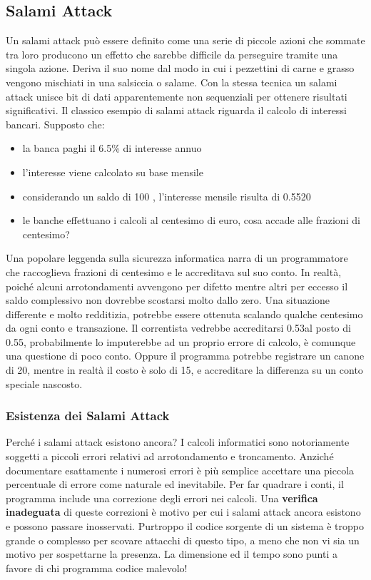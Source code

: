 \subsection{Salami Attack}
Un salami attack può essere definito come una serie di piccole azioni che sommate tra loro producono un effetto che sarebbe difficile da perseguire tramite una singola azione.
Deriva il suo nome dal modo in cui i pezzettini di carne e grasso vengono mischiati in una salsiccia o salame. Con la stessa tecnica un salami attack unisce bit di dati apparentemente non sequenziali per ottenere risultati significativi. Il classico esempio di salami attack riguarda il calcolo di interessi bancari. Supposto che:
\begin{itemize}
	\item la banca paghi il 6.5\% di interesse annuo
	\item l'interesse viene calcolato su base mensile
	\item considerando un saldo di 100 \officialeuro, l'interesse mensile risulta di 0.5520 \officialeuro
	\item le banche effettuano i calcoli al centesimo di euro, cosa accade alle frazioni di centesimo?
\end{itemize}
Una popolare leggenda sulla sicurezza informatica narra di un programmatore che raccoglieva frazioni di centesimo e le accreditava sul suo conto.
In realtà, poiché alcuni arrotondamenti avvengono per difetto mentre altri per eccesso il saldo complessivo non dovrebbe scostarsi molto dallo zero.
\newline
Una situazione differente e molto redditizia, potrebbe essere ottenuta scalando qualche centesimo da ogni conto e transazione. Il correntista vedrebbe accreditarsi 0.53\officialeuro al posto di 0.55\officialeuro, probabilmente lo imputerebbe ad un proprio errore di calcolo, è comunque una questione di poco conto.
Oppure il programma potrebbe registrare un canone di 20\officialeuro, mentre in realtà il costo è solo di 15\officialeuro, e accreditare la differenza su un conto speciale nascosto.
\subsubsection{Esistenza dei Salami Attack}
Perché i salami attack esistono ancora? I calcoli informatici sono notoriamente soggetti a piccoli errori relativi ad arrotondamento e troncamento. Anziché documentare esattamente i numerosi errori è più semplice accettare una piccola percentuale di errore come naturale ed inevitabile. 
Per far quadrare i conti, il programma include una correzione degli errori nei calcoli. Una \textbf{verifica inadeguata} di queste correzioni è motivo per cui i salami attack ancora esistono e possono passare inosservati. 
Purtroppo il codice sorgente di un sistema è troppo grande o complesso per scovare attacchi di questo tipo, a meno che non vi sia un motivo per sospettarne la presenza. La dimensione ed il tempo sono punti a favore di chi programma codice malevolo!